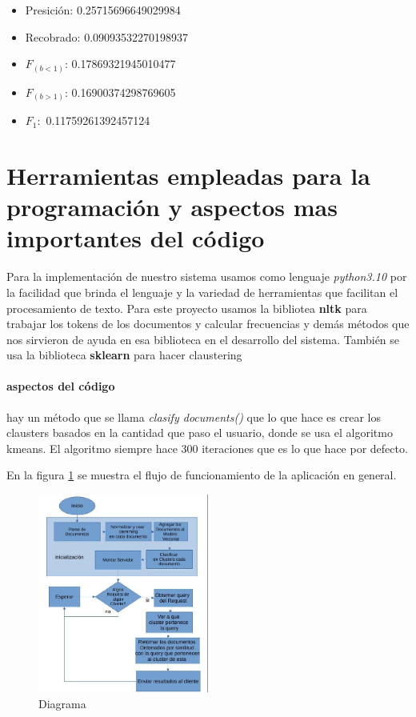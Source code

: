 \documentclass{llncs}
\begin{document}
\begin{flushleft}
		\begin{itemize}
			\item Presici\'on:  0.25715696649029984
			\item Recobrado:  0.09093532270198937
			\item $F_{(b<1)}$: 0.17869321945010477
			\item $F_{(b>1)}$:  0.16900374298769605
			\item $F_1:$ 0.11759261392457124
		\end{itemize}
		
		
	\end{flushleft}
	
	
	
	
	
	
	
	\section{Herramientas empleadas para la programaci\'on y aspectos mas importantes del c\'odigo} 
	
	Para la implementaci\'on de nuestro sistema usamos como lenguaje \textit{python3.10} por la facilidad que brinda el lenguaje y la variedad de herramientas que facilitan el procesamiento de texto. Para este proyecto usamos la bibliotea \textbf{nltk} para trabajar los tokens de los documentos y calcular frecuencias y dem\'as m\'etodos que nos sirvieron de ayuda en esa biblioteca en el desarrollo del sistema. Tambi\'en se usa la biblioteca \textbf{sklearn} para hacer claustering 
	
	\paragraph{aspectos del c\'odigo} 
	hay un m\'etodo que se llama \textit{clasify documents()} que lo que hace es crear los clausters basados en la cantidad que paso el usuario, donde se usa el algoritmo kmeans. El algoritmo siempre hace 300 iteraciones que es lo que hace por defecto.
	
	En la figura \ref{fig:diagram} se  muestra el flujo de funcionamiento de la aplicaci\'on en general. 
	
	\begin{figure}[h]
		\centering 
		\includegraphics[width=0.5\textwidth]{img/diagram.jpg}
		\caption{Diagrama}
		\label{fig:diagram}
	\end{figure}
	
\end{document}
